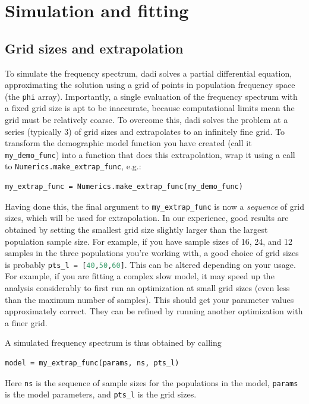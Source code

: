 \documentclass[12pt]{article}
\makeatletter
\newcommand{\dadi}{dadi\xspace}
\newcommand{\py}[1]{\lstinline[language=Python, showstringspaces=False]@#1@}
\makeatother
\begin{document}
\clearpage

\section{Simulation and fitting}

\subsection{Grid sizes and extrapolation}

To simulate the frequency spectrum, \dadi solves a partial differential equation, approximating the solution using a grid of points in population frequency space (the \py{phi} array).
Importantly, a single evaluation of the frequency spectrum with a fixed grid size is apt to be inaccurate, because computational limits mean the grid must be relatively coarse.
To overcome this, \dadi solves the problem at a series (typically 3) of grid sizes and extrapolates to an infinitely fine grid.
To transform the demographic model function you have created (call it \py{my_demo_func}) into a function that does this extrapolation, wrap it using a call to \py{Numerics.make_extrap_func}, e.g.:
\begin{lstlisting}
my_extrap_func = Numerics.make_extrap_func(my_demo_func)
\end{lstlisting}
Having done this, the final argument to \py{my_extrap_func} is now a \emph{sequence} of grid sizes, which will be used for extrapolation.
In our experience, good results are obtained by setting the smallest grid size slightly larger than the largest population sample size.
For example, if you have sample sizes of 16, 24, and 12 samples in the three populations you're working with, a good choice of grid sizes is probably \py{pts_l = [40,50,60]}.
This can be altered depending on your usage. For example, if you are fitting a complex slow model, it may speed up the analysis considerably to first run an optimization at small grid sizes (even less than the maximum number of samples).
This should get your parameter values approximately correct.
They can be refined by running another optimization with a finer grid.

A simulated frequency spectrum is thus obtained by calling
\begin{lstlisting}
model = my_extrap_func(params, ns, pts_l)
\end{lstlisting}
Here \py{ns} is the sequence of sample sizes for the populations in the model, \py{params} is the model parameters, and \py{pts_l} is the grid sizes.
\end{document}
